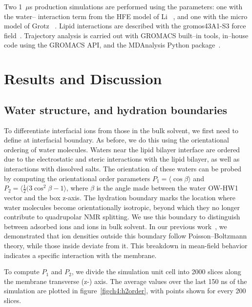 Two 1~$\mu$s production simulations are performed using the 
parameters: one with the water--\mg{} interaction term from the HFE
model of Li \etal~\cite{merzhfe}, and one with the \mg{} micro model of
Grotz \etal~\cite{grotz:2021:optimized,micro}. Lipid interactions are
described with the gromos43A1-S3 force field~\cite{chiu:2009}.
Trajectory analysis is carried out with GROMACS built--in tools,
in--house code using the GROMACS API, and the MDAnalysis Python
package~\cite{mdanalysis1,mdanalysis2}.

\section{Results and Discussion}

\subsection{Water structure, and hydration boundaries}
To differentiate interfacial ions from those in the bulk solvent, we first need to define at interfacial boundary. As before\cite{saunders:2024}, we do this using the orientational ordering of water molecules. Waters near the lipid bilayer interface are ordered due to the electrostatic and steric interactions with the lipid bilayer, as well as interactions with dissolved salts. The
orientation of these waters can be probed by computing the orientational order parameters $P_1=\langle\cos{\beta}\rangle$ and $P_2=\langle{\frac{1}{2}(3\cos^{2}{\beta}-1}\rangle$, where $\beta$ is the angle made between the water OW-HW1 vector and the box z-axis. The hydration boundary marks the location where water molecules become orientationally isotropic, beyond which they no longer contribute to quadrupolar NMR splitting. We use this boundary to distinguish between adsorbed ions and ions in bulk solvent. In our previous work~\cite{saunders:2024}, we demonstrated that ion densities outside this boundary follow Poisson–Boltzmann theory, while those inside deviate from it. This breakdown in mean-field behavior indicates a specific interaction with the membrane. 

To compute $P_1$ and $P_2$, we divide the simulation unit cell into 2000 slices along the membrane transverse (z-) axis.  
The average values over the last 150 ns of the simulation are plotted in figure~\ref{figch4:h2order}, with points shown for every 200 slices. 

